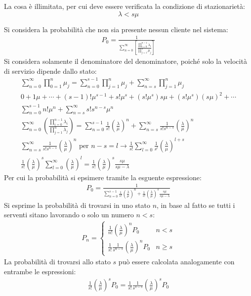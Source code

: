 \documentclass{article}
\numberwithin{equation}{subsection}
\begin{document}
La cosa è illimitata, per cui deve essere verificata la condizione di stazionarietà: 
\begin{equation*}
    \lambda<s\mu
\end{equation*}

Si considera la probabilità che non sia presente nessun cliente nel sistema:
\begin{gather*}
    P_0=\displaystyle\frac{1}{\displaystyle\sum_{n=0}^{\infty}\left[\frac{\displaystyle\prod_{i=0}^{n-1}\lambda_i}{\displaystyle\prod_{j=1}^n\mu_j}\right]}
\end{gather*}
Si considera solamente il denominatore del denominatore, poiché solo la velocità di servizio dipende dallo stato:
\begin{gather*}
    \displaystyle\sum_{n=0}^{\infty}\prod_{0=1}^n\mu_j=\sum_{n=0}^{s-1}\prod_{j=1}^n\mu_j+\sum_{n=s}^{\infty}\prod_{j=1}^n\mu_j\\
    0+1\mu+\cdots+(s-1)!\mu^{s-1}+s!\mu^s+(s!\mu^s)s\mu+(s!\mu^s)(s\mu)^2+\cdots\\
    \displaystyle\sum_{n=0}^{s-1}n!\mu^n+\sum_{n=s}^{\infty}s!s^{n-s}\mu^n\\
    \displaystyle\sum_{n=0}^{\infty}\left(\frac{\displaystyle\prod_{i=0}^{n-1}\lambda_i}{\displaystyle\prod_{j=1}^n\lambda_j}\right)=\sum_{n=0}^{s-1}\frac{1}{s!}\left(\frac{\lambda}{\mu}\right)^n+\sum_{n=s}^{\infty}\frac{1}{s!s^{n-s}}\left(\frac{\lambda}{\mu}\right)^n\\
    \displaystyle\sum_{n=s}^{\infty}\frac{1}{s!s^{n-s}}\left(\frac{\lambda}{\mu}\right)^n\mbox{ per }n-s=l\to\frac{1}{s!}\sum_{l=0}^{\infty}\frac{1}{s^l}\left(\frac{\lambda}{\mu}\right)^{l+s}\\
    \frac{1}{s!}\left(\frac{\lambda}{\mu}\right)^s\sum_{l=0}^{\infty}\left(\frac{\lambda}{\mu}\right)^l=\frac{1}{s!}\left(\frac{\lambda}{\mu}\right)^s\frac{s\mu}{s\mu-\lambda}
\end{gather*}
Per cui la probabilità si epsimere tramite la esguente espressione:
\begin{gather}
    P_0=\displaystyle\frac{1}{\displaystyle\sum_{n=0}^{s-1}\frac{1}{s!}\left(\frac{\lambda}{\mu}\right)^n+\frac{1}{s!}\left(\frac{\lambda}{\mu}\right)^s\frac{s\mu}{s\mu-\lambda}}
\end{gather}
Si esprime la probabilità di trovarsi in uno stato $n$, in base al fatto se tutti i serventi sitano lavorando o solo un numero $n<s$:
\begin{gather*}
   P_n=\begin{cases}
    \displaystyle\frac{1}{n!}\left(\frac{\lambda}{\mu}\right)^nP_0&n<s\\
    \displaystyle\frac{1}{s!}\frac{1}{s^{n-s}}\left(\frac{\lambda}{\mu}\right)^nP_0&n\geq s
   \end{cases} 
\end{gather*}
La probabilità di trovarsi allo stato $s$ può essere calcolata analogamente con entrambe le espressioni:
\begin{gather*}
    \displaystyle\frac{1}{s!}\left(\frac{\lambda}{\mu}\right)^sP_0=\frac{1}{s!}\frac{1}{s^{s-s}}\left(\frac{\lambda}{\mu}\right)^sP_0
\end{gather*}
\end{document}
